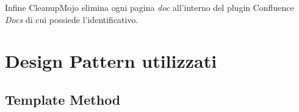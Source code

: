 Infine CleanupMojo elimina ogni pagina \emph{doc} all'interno del plugin Confluence \emph{Docs} di cui possiede l'identificativo.








\section{Design Pattern utilizzati}

\subsection{Template Method}

